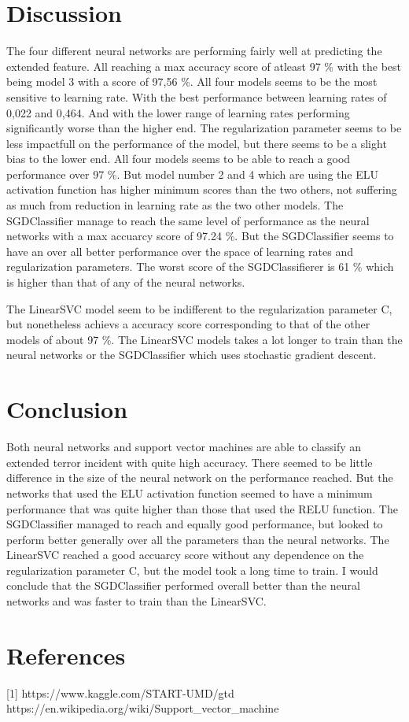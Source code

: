 \documentclass[reprint,english,notitlepage]{revtex4-2}  %
\begin{document}
\section{Discussion}
The four different neural networks are performing fairly well at predicting the extended feature. All reaching a max accuracy score of atleast 97 \% with the best being model 3 with a score of 97,56 \%. 
All four models seems to be the most sensitive to learning rate. With the best performance between learning rates of 0,022 and 0,464. And with the lower range of learning rates performing significantly worse than the higher end. 
The regularization parameter seems to be less impactfull on the performance of the model, but there seems to be a slight bias to the lower end. 	
All four models seems to be able to reach a good performance over 97 \%. But model number 2 and 4 which are using the ELU activation function has higher minimum scores than the two others, not suffering as much from reduction in learning rate as the two other models. 
\newline
The SGDClassifier manage to reach the same level of performance as the neural networks with a max accuarcy score of 97.24 \%. But the SGDClassifier seems to have an over all better performance over the space of learning rates and regularization parameters. The worst score of the SGDClassifierer  is 61 \% which is higher than that of any of the neural networks. 

The LinearSVC model seem to be indifferent to the regularization parameter C, but nonetheless achievs a accuracy score corresponding to that of the other models of about 97 \%. The LinearSVC models takes a lot longer to train than the neural networks or the SGDClassifier which uses stochastic gradient descent.  

\section{Conclusion}

Both neural networks and support vector machines are able to classify an extended terror incident with quite high accuracy. There seemed to be little difference in the size of the neural network on the performance reached. But the networks that used the ELU activation function seemed to have a minimum performance that was quite higher than those that used the RELU function. 
The SGDClassifier managed to reach and equally good performance, but looked to perform better generally over all the parameters than the neural networks. The LinearSVC reached a good accuarcy score without any dependence on the regularization parameter C, but the model took a long time to train. I would conclude that the SGDClassifier performed overall better than the neural networks and was faster to train than the LinearSVC. 


\section*{References}  %
[1] https://www.kaggle.com/START-UMD/gtd \newline
[2] https://en.wikipedia.org/wiki/Support\_vector\_machine
\end{document}
